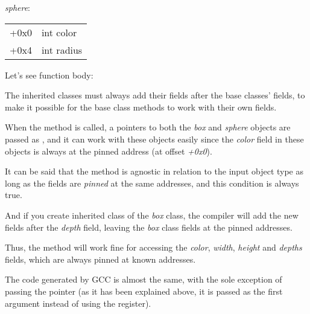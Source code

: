 \emph{sphere}:

\begin{center}
\begin{tabular}{ | l | l | }
\hline
  \tableheader{} \\
\hline
  +0x0 & int color \\
\hline
  +0x4 & int radius \\
\hline
\end{tabular}
\end{center}

Let's see \main function body:




The inherited classes must always add their fields after the base classes' fields, to make it possible for the base 
class methods to work with their own fields.


When the  method is called, a pointers to both the \emph{box} and \emph{sphere} objects are passed as ,
and it can work with these objects easily since the \emph{color} field in these objects is always at the pinned address (at offset \emph{+0x0}).


It can be said that the  method is agnostic in relation to the input object type as long as the fields are \emph{pinned}
at the same addresses, and this condition is always true.


And if you create inherited class of the \emph{box} class, 
the compiler will add the new fields after the \emph{depth} field,
leaving the \emph{box} class fields at the pinned addresses.


Thus, the  method will work fine for accessing the 
\emph{color}, \emph{width}, \emph{height} and \emph{depths} fields, which are always pinned at known addresses.


The code generated by GCC is almost the same, with the sole exception of passing the  pointer (as it has been explained above,
it is passed as the first argument instead of using the \ECX register).

